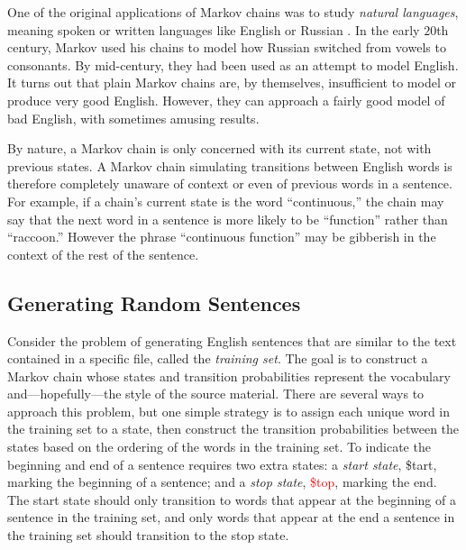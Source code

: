 One of the original applications of Markov chains was to study \emph{natural languages}, meaning spoken or written languages like English or Russian \cite{von2006five}.
In the early $20$th century, Markov used his chains to model how Russian switched from vowels to consonants.
By mid-century, they had been used as an attempt to model English.
It turns out that plain Markov chains are, by themselves, insufficient to model or produce very good English.
However, they can approach a fairly good model of bad English, with sometimes amusing results.

By nature, a Markov chain is only concerned with its current state, not with previous states.
A Markov chain simulating transitions between English words is therefore completely unaware of context or even of previous words in a sentence.
For example, if a chain's current state is the word ``continuous,'' the chain may say that the next word in a sentence is more likely to be ``function'' rather than ``raccoon.''
However the phrase ``continuous function'' may be gibberish in the context of the rest of the sentence.


\subsection*{Generating Random Sentences} %

Consider the problem of generating English sentences that are similar to the text contained in a specific file, called the \emph{training set}.
The goal is to construct a Markov chain whose states and transition probabilities represent the vocabulary and---hopefully---the style of the source material.
There are several ways to approach this problem, but one simple strategy is to assign each unique word in the training set to a state, then construct the transition probabilities between the states based on the ordering of the words in the training set.
To indicate the beginning and end of a sentence requires two extra states: a \emph{start state}, \textcolor[rgb]{0,.6,0}{\$tart}, marking the beginning of a sentence; and a \emph{stop state}, \textcolor{red}{\$top}, marking the end.
The start state should only transition to words that appear at the beginning of a sentence in the training set, and only words that appear at the end a sentence in the training set should transition to the stop state.

